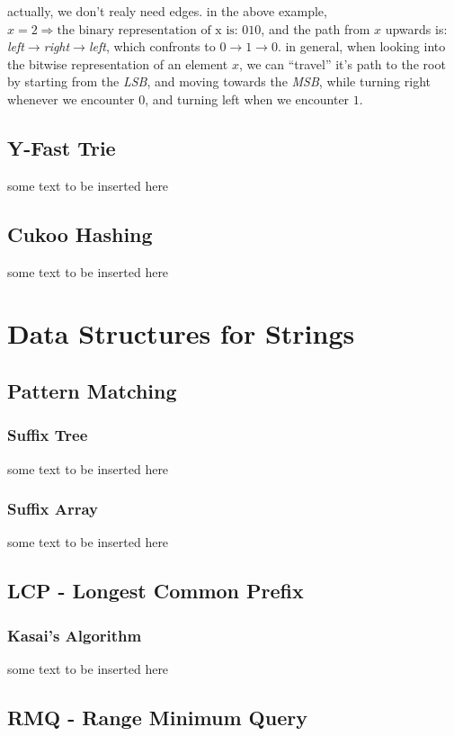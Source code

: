 \documentclass[11pt]{book}
\begin{document}
actually, we don't realy need edges. in the above example, 
$x=2 \Longrightarrow \text{the binary representation of x is: }010$, 
and the path from $x$ upwards is: \emph{left$\to{}$right$\to{}$left}, 
which confronts to $0\to{}1\to{}0$. in general, 
when looking into the bitwise representation of an element $x$, 
we can ``travel'' it's path to the root by starting from the \emph{LSB}, 
and moving towards the \emph{MSB}, while turning right whenever we encounter $0$, 
and turning left when we encounter $1$.
\newpage

\section{Y-Fast Trie}
some text to be inserted here
\newpage

\section{Cukoo Hashing}
some text to be inserted here
\newpage

\chapter{Data Structures for Strings}
\section{Pattern Matching}
\subsection{Suffix Tree}
some text to be inserted here
\newpage

\subsection{Suffix Array}
some text to be inserted here
\newpage

\section{LCP - Longest Common Prefix}
\subsection{Kasai's Algorithm}
some text to be inserted here
\newpage

\section{RMQ - Range Minimum Query}
\end{document}
